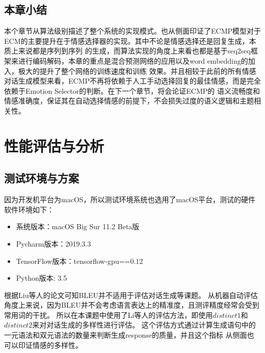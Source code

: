 \documentclass[supercite]{HustGraduPaper}
\theoremstyle{definition}
\begin{document}
\subsection{本章小结}
本个章节从算法级别描述了整个系统的实现模式。也从侧面印证了ECMP模型对于ECM的主要提升在于情感选择器的实现。其中不论是情感选择还是回复生成，本质上来说都是序列到序列
的生成，而算法实现的角度上来看也都是基于seq2seq框架来进行编码解码，本章的重点是混合预测网络的应用以及word embedding的加入，极大的提升了整个网络的训练速度和训练
效果。并且相较于此前的所有情感对话生成模型来看，ECMP不再将依赖于人工手动选择回复的最佳情感，而是完全依赖于Emotion Selector的判断。在下一个章节，将会论证ECMP的
语义流畅度和情感准确度，保证其在自动选择情感的前提下，不会损失过度的语义逻辑和主题相关性。

\section{性能评估与分析}
\subsection{测试环境与方案}
因为开发机平台为macOS，所以测试环境系统也选用了macOS平台，测试的硬件软件环境如下：
\begin{itemize}
  \item 系统版本：macOS Big Sur 11.2 Beta版
  \item Pycharm版本：2019.3.3
  \item TensorFlow版本：tensorflow-gpu==0.12
  \item Python版本: 3.5
\end{itemize}

根据Liu等人的论文可知BLEU并不适用于评估对话生成等课题。
从机器自动评估角度上来说，因为BLEU并不会考虑语言表达上的精准度，且测评精度经常会受到常用词的干扰。
所以在本课题中使用了Li等人的评估方法，即使用$distinct 1$和$distinct 2$来对对话生成的多样性进行评估。
这个评估方式通过计算生成语句中的一元语法和双元语法的数量来判断生成response的质量，并且这个指标
从侧面也可以印证情感的多样性。
\end{document}
